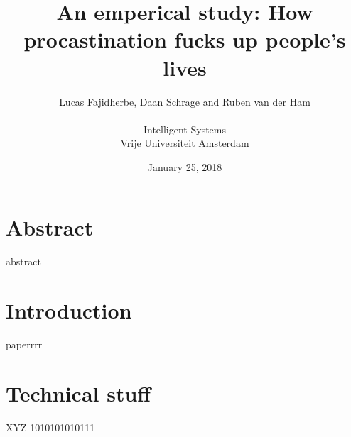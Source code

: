 \documentclass[a4paper,12pt]{article}
\title{An emperical study: How procastination fucks up people's lives}
\date{January 25, 2018}
\author{Lucas Fajidherbe, Daan Schrage and Ruben van der Ham\\\\
	\small Intelligent Systems\\
	\small Vrije Universiteit Amsterdam}
\begin{document}
\maketitle
\titlepage

\tableofcontents
\clearpage

\section*{Abstract}
abstract

\section{Introduction}

paperrrr

\section{Technical stuff}
XYZ 1010101010111
\end{document}

